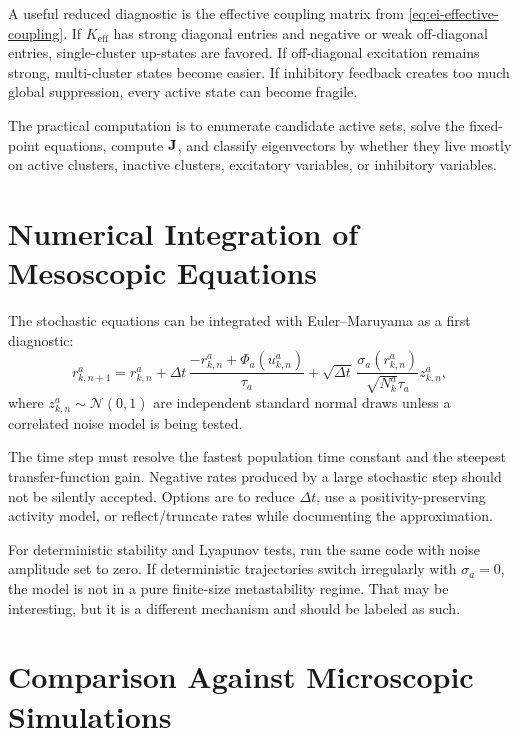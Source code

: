 A useful reduced diagnostic is the effective coupling matrix from \cref{eq:ei-effective-coupling}. If $K_{\mathrm{eff}}$ has strong diagonal entries and negative or weak off-diagonal entries, single-cluster up-states are favored. If off-diagonal excitation remains strong, multi-cluster states become easier. If inhibitory feedback creates too much global suppression, every active state can become fragile.

The practical computation is to enumerate candidate active sets, solve the fixed-point equations, compute $\mathbf{J}$, and classify eigenvectors by whether they live mostly on active clusters, inactive clusters, excitatory variables, or inhibitory variables.

\section{Numerical Integration of Mesoscopic Equations}
\label{sec:numerical-integration-mesoscopic-equations}

The stochastic equations can be integrated with Euler--Maruyama as a first diagnostic:
%
\begin{equation}
  r_{k,n+1}^{a}
  =
  r_{k,n}^{a}
  +
  \Delta t\,
  \frac{-r_{k,n}^{a}+\Phi_a(u_{k,n}^{a})}{\tau_a}
  +
  \sqrt{\Delta t}\,
  \frac{\sigma_a(r_{k,n}^{a})}{\sqrt{N_k^a}\tau_a}
  z_{k,n}^{a},
  \label{eq:ei-euler-maruyama}
\end{equation}
%
where $z_{k,n}^{a}\sim \mathcal{N}(0,1)$ are independent standard normal draws unless a correlated noise model is being tested.

The time step must resolve the fastest population time constant and the steepest transfer-function gain. Negative rates produced by a large stochastic step should not be silently accepted. Options are to reduce $\Delta t$, use a positivity-preserving activity model, or reflect/truncate rates while documenting the approximation.

For deterministic stability and Lyapunov tests, run the same code with noise amplitude set to zero. If deterministic trajectories switch irregularly with $\sigma_a=0$, the model is not in a pure finite-size metastability regime. That may be interesting, but it is a different mechanism and should be labeled as such.

\section{Comparison Against Microscopic Simulations}
\label{sec:comparison-against-microscopic-simulations}


